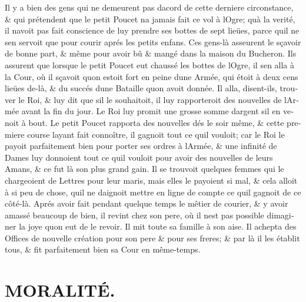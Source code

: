 \documentclass[14pt,a4paper]{memoir}
\newcommand{\notesection}[1]{%
  \addtonotes{\protect\par\protect\vspace{2ex}\protect\noindent\textbf{#1}\protect\par\protect\vspace{1ex}}%
}
\begin{document}
{{\begin{otherlanguage}{french}
Il y a bien des gens qui ne demeurent pas d\textquotesingle acord de
cette derniere circonstance, \& qui prétendent que le petit Poucet
n\textquotesingle a jamais fait ce vol à l\textquotesingle Ogre;
qu\textquotesingle à la verité, il n\textquotesingle avoit pas fait
conscience de luy prendre ses bottes de sept lieües, parce
qu\textquotesingle il ne s\textquotesingle en servoit que pour courir
aprés les petits enfans. Ces gens-là asseurent le sçavoir de bonne part,
\& même pour avoir bû \& mangé dans la maison du Bucheron. Ils assurent
que lorsque le petit Poucet eut chaussé les bottes de
l\textquotesingle Ogre, il s\textquotesingle en alla à la Cour, où il
sçavoit qu\textquotesingle on estoit fort en peine d\textquotesingle une
Armée, qui étoit à deux cens lieües de-là, \& du succés
d\textquotesingle une Bataille qu\textquotesingle on avoit donnée. Il
alla, disent-ils, trouver le Roi, \& luy dit que s\textquotesingle il le
souhaitoit, il luy rapporteroit des nouvelles de l\textquotesingle Armée
avant la fin du jour. Le Roi luy promit une grosse somme
d\textquotesingle argent s\textquotesingle il en venoit à bout. Le petit
Poucet rapporta des nouvelles dés le soir même, \& cette premiere course
l\textquotesingle ayant fait connoître, il gagnoit tout ce
qu\textquotesingle il vouloit; car le Roi le payoit parfaitement bien
pour porter ses ordres à l\textquotesingle Armée, \& une infinité de
Dames luy donnoient tout ce qu\textquotesingle il vouloit pour avoir des
nouvelles de leurs Amans, \& ce fut là son plus grand gain. Il se
trouvoit quelques femmes qui le chargeoient de Lettres pour leur maris,
mais elles le payoient si mal, \& cela alloit à si peu de chose,
qu\textquotesingle il ne daignoit mettre en ligne de compte ce
qu\textquotesingle il gagnoit de ce côté-là. Aprés avoir fait pendant
quelque temps le mêtier de courier, \& y avoir amassé beaucoup de bien,
il revint chez son pere, où il n\textquotesingle est pas possible
d\textquotesingle imaginer la joye qu\textquotesingle on eut de le
revoir. Il mit toute sa famille à son aise. Il achepta des Offices de
nouvelle création pour son pere \& pour ses freres; \& par là il les
établit tous, \& fit parfaitement bien sa Cour en même-temps.

\section{MORALITÉ.}
\notesection{MORALITÉ.}

\begin{verse}
  \small


\end{verse}
\end{otherlanguage}}}
\end{document}
